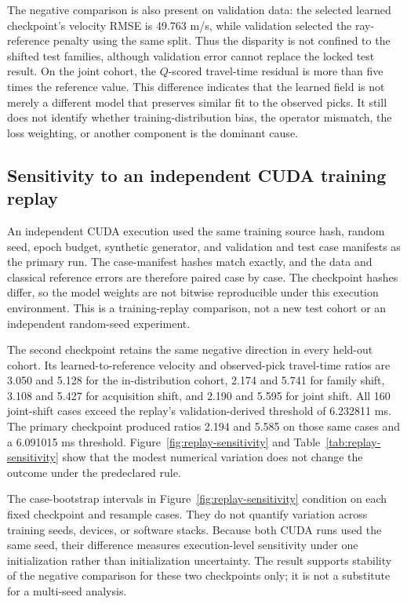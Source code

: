 \documentclass[11pt]{article}
\begin{document}
The negative comparison is also present on validation data: the selected learned checkpoint's velocity RMSE is 49.763 m/s, while validation selected the ray-reference penalty using the same split. Thus the disparity is not confined to the shifted test families, although validation error cannot replace the locked test result. On the joint cohort, the $Q$-scored travel-time residual is more than five times the reference value. This difference indicates that the learned field is not merely a different model that preserves similar fit to the observed picks. It still does not identify whether training-distribution bias, the operator mismatch, the loss weighting, or another component is the dominant cause.

\subsection{Sensitivity to an independent CUDA training replay}
\label{sec:replay-sensitivity}
An independent CUDA execution used the same training source hash, random seed, epoch budget, synthetic generator, and validation and test case manifests as the primary run. The case-manifest hashes match exactly, and the data and classical reference errors are therefore paired case by case. The checkpoint hashes differ, so the model weights are not bitwise reproducible under this execution environment. This is a training-replay comparison, not a new test cohort or an independent random-seed experiment.

The second checkpoint retains the same negative direction in every held-out cohort. Its learned-to-reference velocity and observed-pick travel-time ratios are 3.050 and 5.128 for the in-distribution cohort, 2.174 and 5.741 for family shift, 3.108 and 5.427 for acquisition shift, and 2.190 and 5.595 for joint shift. All 160 joint-shift cases exceed the replay's validation-derived threshold of 6.232811 ms. The primary checkpoint produced ratios 2.194 and 5.585 on those same cases and a 6.091015 ms threshold. Figure~\ref{fig:replay-sensitivity} and Table~\ref{tab:replay-sensitivity} show that the modest numerical variation does not change the outcome under the predeclared rule.

The case-bootstrap intervals in Figure~\ref{fig:replay-sensitivity} condition on each fixed checkpoint and resample cases. They do not quantify variation across training seeds, devices, or software stacks. Because both CUDA runs used the same seed, their difference measures execution-level sensitivity under one initialization rather than initialization uncertainty. The result supports stability of the negative comparison for these two checkpoints only; it is not a substitute for a multi-seed analysis.
\end{document}
